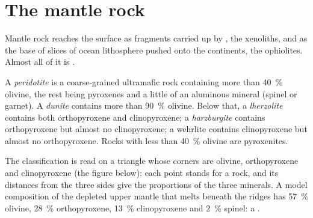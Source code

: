 \section{The mantle rock}\label{sec:b2:mantle-melting:rock}

Mantle rock reaches the surface as fragments carried up by , the
xenoliths, and as the base of slices of ocean lithosphere pushed onto the
continents, the ophiolites. Almost all of it is .

\begin{definition}\label{def:b2:mantle-melting:peridotites}
A \emph{peridotite} is a coarse-grained ultramafic rock
containing more than \qty{40}{\percent} olivine, the rest being pyroxenes and a
little of an aluminous mineral (spinel or garnet). A
\emph{dunite} contains more than \qty{90}{\percent} olivine. Below
that, a \emph{lherzolite} contains both orthopyroxene and
clinopyroxene; a \emph{harzburgite} contains orthopyroxene but
almost no clinopyroxene; a wehrlite contains clinopyroxene but almost no
orthopyroxene. Rocks with less than \qty{40}{\percent} olivine are pyroxenites.
\end{definition}

The classification is read on a triangle whose corners are olivine,
orthopyroxene and clinopyroxene (the figure below): each point stands for a rock,
and its distances from the three sides give the proportions of the three
minerals. A model composition of the depleted upper mantle that melts beneath
the ridges has \qty{57}{\percent} olivine,
\qty{28}{\percent} orthopyroxene, \qty{13}{\percent} clinopyroxene and
\qty{2}{\percent} spinel: a .

